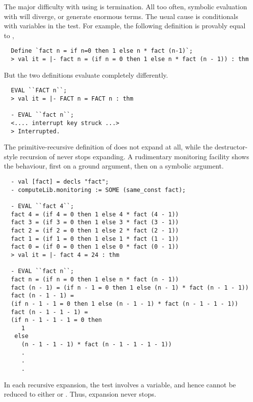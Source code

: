The major difficulty with using  is termination. All too
often, symbolic evaluation with  will diverge, or generate
enormous terms. The usual cause is conditionals with variables in the
test. For example, the following definition is provably equal to ,
%
\begin{session}
\begin{verbatim}
  Define `fact n = if n=0 then 1 else n * fact (n-1)`;
  > val it = |- fact n = (if n = 0 then 1 else n * fact (n - 1)) : thm
\end{verbatim}
\end{session}
%
But the two definitions evaluate completely differently.
%
\begin{session}
\begin{verbatim}
  EVAL ``FACT n``;
  > val it = |- FACT n = FACT n : thm

  - EVAL ``fact n``;
  <.... interrupt key struck ...>
  > Interrupted.
\end{verbatim}
\end{session}
%
The primitive-recursive definition of  does not expand
at all, while the destructor-style recursion of  never stops
expanding. A rudimentary monitoring facility shows the behaviour, first
on a ground argument, then on a symbolic argument.
%
\begin{session}
\begin{verbatim}
  - val [fact] = decls "fact";
  - computeLib.monitoring := SOME (same_const fact);

  - EVAL ``fact 4``;
  fact 4 = (if 4 = 0 then 1 else 4 * fact (4 - 1))
  fact 3 = (if 3 = 0 then 1 else 3 * fact (3 - 1))
  fact 2 = (if 2 = 0 then 1 else 2 * fact (2 - 1))
  fact 1 = (if 1 = 0 then 1 else 1 * fact (1 - 1))
  fact 0 = (if 0 = 0 then 1 else 0 * fact (0 - 1))
  > val it = |- fact 4 = 24 : thm

  - EVAL ``fact n``;
  fact n = (if n = 0 then 1 else n * fact (n - 1))
  fact (n - 1) = (if n - 1 = 0 then 1 else (n - 1) * fact (n - 1 - 1))
  fact (n - 1 - 1) =
  (if n - 1 - 1 = 0 then 1 else (n - 1 - 1) * fact (n - 1 - 1 - 1))
  fact (n - 1 - 1 - 1) =
  (if n - 1 - 1 - 1 = 0 then
     1
   else
     (n - 1 - 1 - 1) * fact (n - 1 - 1 - 1 - 1))
     .
     .
     .
\end{verbatim}
\end{session}
%
In each recursive expansion, the test involves a variable, and hence
cannot be reduced to either  or . Thus, expansion
never stops.

